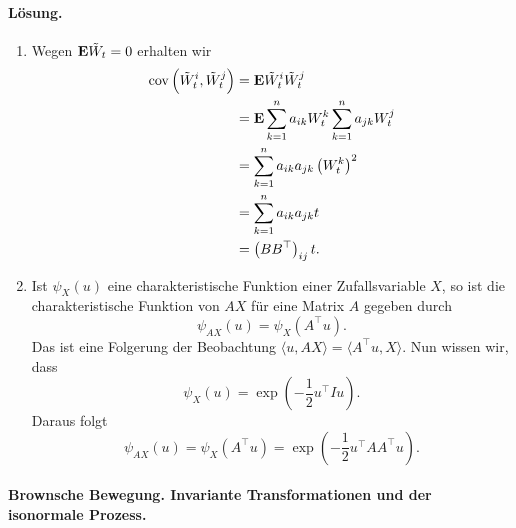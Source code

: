 \paragraph*{Lösung.}
\begin{enumerate}
    \item Wegen $\mathbf{E} \tilde W_t=0$ erhalten wir 
        \begin{align*}
            \operatorname{cov} \left( \tilde W_t^{i}, \tilde W_t^{j} \right) 
            &= \mathbf{E} \tilde W_t^i \tilde W_t^j \\
            &= \mathbf{E} \sum_{k=1}^{n} a_{ik} W_t^k \sum_{k=1}^{n} a_{jk} W_t^j \\
            &= \sum_{k=1}^{n} a_{ik} a_{jk} \left( W_t^k \right)^2 \\
            &= \sum_{k=1}^{n} a_{ik} a_{jk} t \\
            &= \left( B B^\top \right)_{ij} t.
        \end{align*}
    \item Ist $\psi_X(u)$ eine charakteristische Funktion einer Zufallsvariable 
        $X$, so ist die charakteristische Funktion von $AX$ für eine Matrix $A$ gegeben
        durch
        \begin{equation*}
            \psi_{AX}(u) = \psi_{X}(A^\top u). 
        \end{equation*}
        Das ist eine Folgerung der Beobachtung $\langle u, AX \rangle = \langle
        A^\top u, X \rangle$. Nun wissen wir, dass
        \begin{equation*}
            \psi_X(u) = \exp \left( - \frac{1}{2} u^\top I u \right). 
        \end{equation*}
        Daraus folgt
        \begin{equation*}
            \psi_{AX}(u) = \psi_X(A^\top u) = 
            \exp \left( -\frac{1}{2} u^\top AA^\top u \right).
        \end{equation*}
\end{enumerate}



\paragraph{Brownsche Bewegung. Invariante Transformationen und der isonormale Prozess.}


